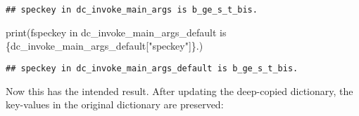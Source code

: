 \documentclass[
]{book}
\newenvironment{Shaded}{\begin{snugshade}}{\end{snugshade}}
\newcommand{\BuiltInTok}[1]{#1}
\newcommand{\NormalTok}[1]{#1}
\newcommand{\SpecialCharTok}[1]{\textcolor[rgb]{0.00,0.00,0.00}{#1}}
\newcommand{\SpecialStringTok}[1]{\textcolor[rgb]{0.31,0.60,0.02}{#1}}
\newcommand{\StringTok}[1]{\textcolor[rgb]{0.31,0.60,0.02}{#1}}
\begin{document}
\begin{verbatim}
## speckey in dc_invoke_main_args is b_ge_s_t_bis.
\end{verbatim}

\begin{Shaded}
\begin{Highlighting}[]
\BuiltInTok{print}\NormalTok{(}\SpecialStringTok{f\textquotesingle{}speckey in dc\_invoke\_main\_args\_default is }\SpecialCharTok{\{}\NormalTok{dc\_invoke\_main\_args\_default[}\StringTok{"speckey"}\NormalTok{]}\SpecialCharTok{\}}\SpecialStringTok{.\textquotesingle{}}\NormalTok{)}
\end{Highlighting}
\end{Shaded}

\begin{verbatim}
## speckey in dc_invoke_main_args_default is b_ge_s_t_bis.
\end{verbatim}

Now this has the intended result. After updating the deep-copied dictionary, the key-values in the original dictionary are preserved:
\end{document}
